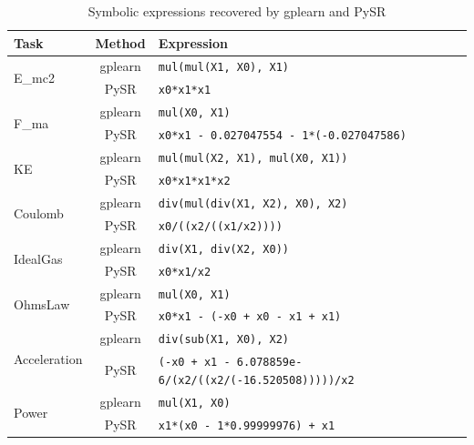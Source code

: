 \begin{table}[H]
\centering
\caption{Symbolic expressions recovered by gplearn and PySR}
\label{tab:symbolic_expressions}
\begin{tabular}{lcl}
\toprule
Task & Method & Expression \\
\midrule
\multirow{2}{*}{E_mc2}
& gplearn & \texttt{mul(mul(X1, X0), X1)} \\
& PySR & \texttt{x0*x1*x1} \\
\midrule
\multirow{2}{*}{F_ma}
& gplearn & \texttt{mul(X0, X1)} \\
& PySR & \texttt{x0*x1 - 0.027047554 - 1*(-0.027047586)} \\
\midrule
\multirow{2}{*}{KE}
& gplearn & \texttt{mul(mul(X2, X1), mul(X0, X1))} \\
& PySR & \texttt{x0*x1*x1*x2} \\
\midrule
\multirow{2}{*}{Coulomb}
& gplearn & \texttt{div(mul(div(X1, X2), X0), X2)} \\
& PySR & \texttt{x0/((x2/((x1/x2))))} \\
\midrule
\multirow{2}{*}{IdealGas}
& gplearn & \texttt{div(X1, div(X2, X0))} \\
& PySR & \texttt{x0*x1/x2} \\
\midrule
\multirow{2}{*}{OhmsLaw}
& gplearn & \texttt{mul(X0, X1)} \\
& PySR & \texttt{x0*x1 - (-x0 + x0 - x1 + x1)} \\
\midrule
\multirow{2}{*}{Acceleration}
& gplearn & \texttt{div(sub(X1, X0), X2)} \\
& PySR & \texttt{(-x0 + x1 - 6.078859e-6/(x2/((x2/(-16.520508)))))/x2} \\
\midrule
\multirow{2}{*}{Power}
& gplearn & \texttt{mul(X1, X0)} \\
& PySR & \texttt{x1*(x0 - 1*0.99999976) + x1} \\
\bottomrule
\end{tabular}
\end{table}

